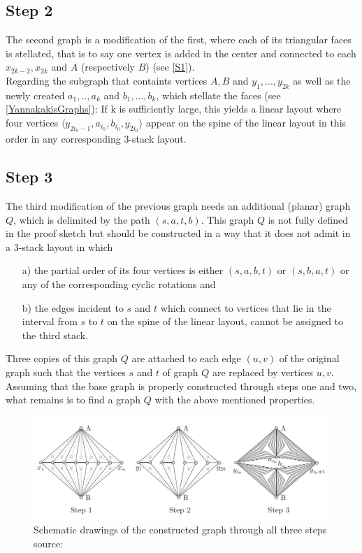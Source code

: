 \subsection{Step 2}
\label{S2}
The second graph is a modification of the first, where each of its triangular faces is stellated, that is to say one vertex is added in the center and  connected to each $x_{2k-2}, x_{2k}$ and $A$ (respectively $B$) (see \autoref{S1}).\\
Regarding the subgraph that containts vertices $A, B$ and $y_1,...,y_{2k}$ as well as the newly created $a_1,..,a_k$ and $b_1,...,b_k$, which stellate the faces (see \autoref{YannakakisGraphs}): If k is sufficiently large, this yields a linear layout where four vertices $\langle y_{2i_{0}-1}, a_{i_{0}}, b_{i_0}, y_{2i_{0}}\rangle$ appear on the spine of the linear layout in this order in any corresponding 3-stack layout.

\subsection{Step 3}
\label{S3}
The third modification of the previous graph needs an additional (planar) graph $Q$, which is delimited by the path $(s,a,t,b)$. This graph $Q$ is not fully defined in the proof sketch but should be constructed in a way that it does not admit in a 3-stack layout in which
\begin{itemize}
\item[a)]the partial order of its four vertices is either $(s,a,b,t)$ or $(s,b,a,t)$ or any of the corresponding cyclic rotations and
\item[b)] the edges incident to $s$ and $t$ which connect to vertices that lie in the interval from $s$ to $t$ on the spine of the linear layout, cannot be assigned to the third stack. 
\end{itemize}
Three copies of this graph $Q$ are attached to each edge $(u,v)$ of the original graph such that the vertices $s$ and $t$ of graph $Q$ are replaced by vertices $u,v$.\\[12pt]
Assuming that the base graph is properly constructed through steps one and two, what remains is to find a graph $Q$ with the above mentioned properties.\\
\begin{figure}[h!]
\begin{center}
\includegraphics[width=1\textwidth]{figures/yannakakis.jpg}
\caption{Schematic drawings of the constructed graph through all three steps\\ source: \cite{bekos2019}}
\label{YannakakisGraphs}
\end{center}
\end{figure}\\
